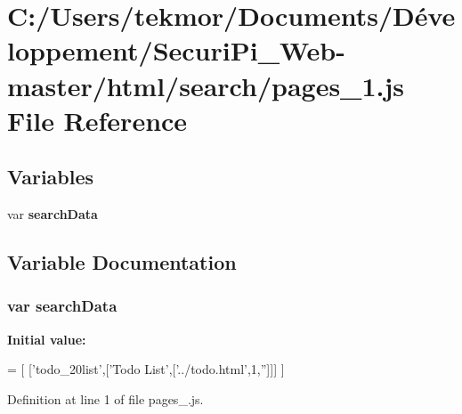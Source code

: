 \section{C\+:/\+Users/tekmor/\+Documents/\+Développement/\+Securi\+Pi\+\_\+\+Web-\/master/html/search/pages\+\_\+1.js File Reference}
\label{pages__1_8js}
\subsection*{Variables}
\begin{DoxyCompactItemize}
\item 
var {\bf search\+Data}
\end{DoxyCompactItemize}


\subsection{Variable Documentation}
\subsubsection[{search\+Data}]{\setlength{\rightskip}{0pt plus 5cm}var search\+Data}\label{pages__1_8js_ad01a7523f103d6242ef9b0451861231e}
{\bfseries Initial value\+:}
\begin{DoxyCode}
=
[
  [\textcolor{stringliteral}{'todo\_20list'},[\textcolor{stringliteral}{'Todo List'},[\textcolor{stringliteral}{'../todo.html'},1,\textcolor{stringliteral}{''}]]]
]
\end{DoxyCode}


Definition at line 1 of file pages\+\_.\+js.

